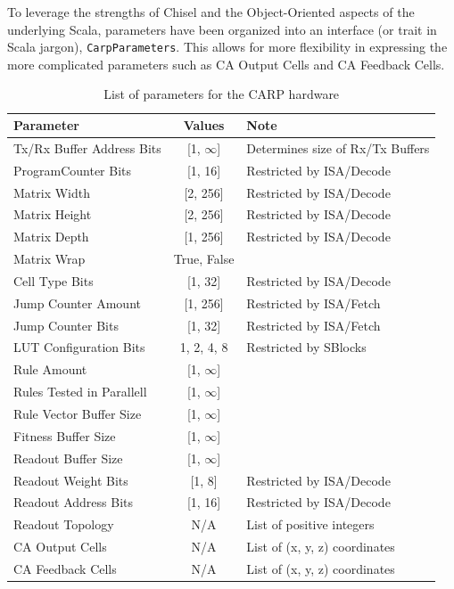 To leverage the strengths of Chisel and the Object-Oriented aspects of the
underlying Scala, parameters have been organized into an interface (or trait in
Scala jargon), \texttt{CarpParameters}. This allows for more flexibility in
expressing the more complicated parameters such as CA Output Cells and CA
Feedback Cells.

\renewcommand{\arraystretch}{1.2}
\begin{table}[ht]
    \begin{tabular}{l|c|l}
    Parameter                 & Values      & Note                             \\ \hline
    Tx/Rx Buffer Address Bits & [1, $\infty$]    & Determines size of Rx/Tx Buffers \\
    ProgramCounter Bits       & [1, 16]     & Restricted by ISA/Decode         \\
    Matrix Width              & [2, 256]    & Restricted by ISA/Decode         \\
    Matrix Height             & [2, 256]    & Restricted by ISA/Decode         \\
    Matrix Depth              & [1, 256]    & Restricted by ISA/Decode         \\
    Matrix Wrap               & True, False & ~                                \\
    Cell Type Bits            & [1, 32]     & Restricted by ISA/Decode         \\
    Jump Counter Amount       & [1, 256]    & Restricted by ISA/Fetch          \\
    Jump Counter Bits         & [1, 32]     & Restricted by ISA/Fetch          \\
    LUT Configuration Bits    & 1, 2, 4, 8  & Restricted by SBlocks            \\
    Rule Amount               & [1, $\infty$]    & ~                                \\
    Rules Tested in Parallell & [1, $\infty$]    & ~                                \\
    Rule Vector Buffer Size   & [1, $\infty$]    & ~                                \\
    Fitness Buffer Size       & [1, $\infty$]    & ~                                \\
    Readout Buffer Size       & [1, $\infty$]    & ~                                \\
    Readout Weight Bits       & [1,  8]     & Restricted by ISA/Decode         \\
    Readout Address Bits      & [1, 16]     & Restricted by ISA/Decode         \\
    Readout Topology          & N/A         & List of positive integers                  \\
    CA Output Cells           & N/A         & List of (x, y, z) coordinates    \\
    CA Feedback Cells         & N/A         & List of (x, y, z) coordinates    \\
    \end{tabular}
    \caption{List of parameters for the CARP hardware}
    \label{tbl:parameters}
\end{table}

